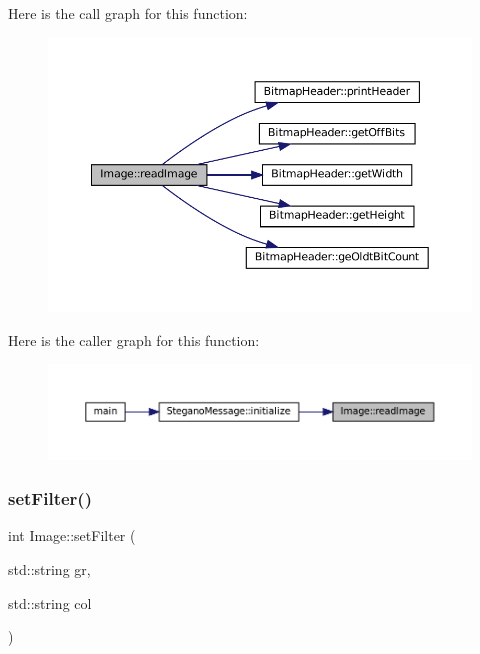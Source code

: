 Here is the call graph for this function\+:\nopagebreak
\begin{figure}[H]
\begin{center}
\leavevmode
\includegraphics[width=350pt]{classImage_ac0aa1f41cb368d87b20dd38839218d93_cgraph}
\end{center}
\end{figure}
Here is the caller graph for this function\+:\nopagebreak
\begin{figure}[H]
\begin{center}
\leavevmode
\includegraphics[width=350pt]{classImage_ac0aa1f41cb368d87b20dd38839218d93_icgraph}
\end{center}
\end{figure}
\mbox{\label{classImage_ac81078a3d6c364aada9afc3c8a668ef8}} 
\subsubsection{\texorpdfstring{setFilter()}{setFilter()}}
{\footnotesize\ttfamily int Image\+::set\+Filter (\begin{DoxyParamCaption}\item[{std\+::string}]{gr,  }\item[{std\+::string}]{col }\end{DoxyParamCaption})}



